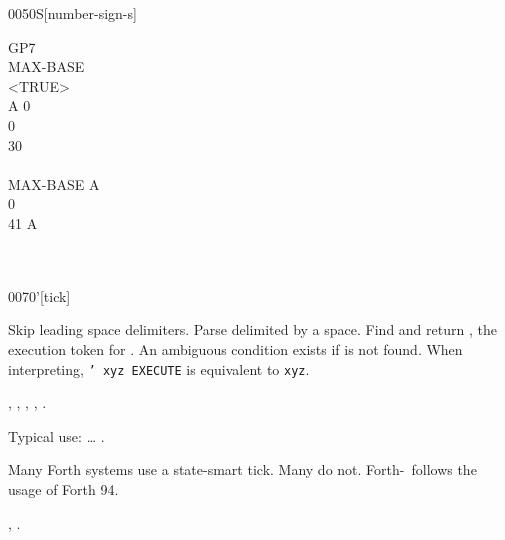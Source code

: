 \begin{worddef}[numS]{0050}{\num{}S}[number-sign-s]
\begin{testing}
		\word{:} GP7 \\
		\tab	{}  		MAX-BASE  \word{!} \\
		\tab	<TRUE> \\
		\tab	A 0  \\
		\tab[2]		 0    \\
		 \word{=}    30 \word{+} \word{=} \word{AND}  \\
		\tab	\word{LOOP} \\
		\tab	MAX-BASE A \word{DO} \\
		\tab[2]		 0   \word{num-end} \\
		 \word{=}   41  A \word{-} \word{+} \word{=}   \\
		\tab	{} \\
		\tab	{}  \word{!} \word{;} \\
	\end{testing}
\end{worddef}

\vspace*{-2ex}
\enlargethispage{6ex}
\begin{worddef}{0070}{'}[tick]
\item {}

	Skip leading space delimiters. Parse  delimited by
	a space. Find  and return , the execution
	token for . An ambiguous condition exists if
	 is not found. When interpreting,
	\texttt{' xyz EXECUTE} is equivalent to \texttt{xyz}.

\see {},
	,
	,
	,
	.

	\begin{rationale} %
		Typical use: {\ldots}  .

		Many Forth systems use a state-smart tick. Many do not.
		Forth-\snapshot\ follows the usage of Forth 94.

	\see {},
		.
	\end{rationale}

	\begin{testing} %
		 \\
	\end{testing}
\end{worddef}


